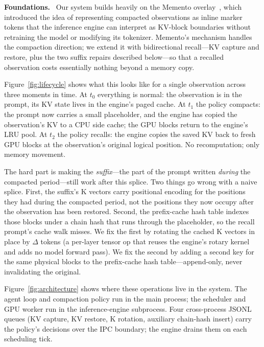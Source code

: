 \documentclass[letterpaper,twocolumn,10pt]{article}
\newcommand{\para}[1]{\smallskip\noindent\textbf{#1.}\ }
\begin{document}
\para{Foundations} Our system builds heavily on the Memento
overlay~\cite{kontonis2026memento}, which introduced the idea of
representing compacted observations as inline marker tokens that
the inference engine can interpret as KV-block boundaries
without retraining the model or modifying its tokenizer.
Memento's mechanism handles the compaction direction; we extend
it with bidirectional recall---KV capture and restore, plus the
two suffix repairs described below---so that a recalled
observation costs essentially nothing beyond a memory copy.

Figure~\ref{fig:lifecycle} shows what this looks like for a
single observation across three moments in time. At $t_0$
everything is normal: the observation is in the prompt, its KV
state lives in the engine's paged cache. At $t_1$ the policy
compacts: the prompt now carries a small placeholder, and the
engine has copied the observation's KV to a CPU side cache; the
GPU blocks return to the engine's LRU pool. At $t_2$ the policy
recalls: the engine copies the saved KV back to fresh GPU blocks
at the observation's original logical position. No
recomputation; only memory movement.

The hard part is making the \emph{suffix}---the part of the
prompt written \emph{during} the compacted period---still work
after this splice. Two things go wrong with a naive splice.
First, the suffix's K vectors carry positional encoding for the
positions they had during the compacted period, not the
positions they now occupy after the observation has been
restored. Second, the prefix-cache hash table indexes those
blocks under a chain hash that runs through the placeholder, so
the recall prompt's cache walk misses. We fix the first by
rotating the cached K vectors in place by $\Delta$ tokens (a
per-layer tensor op that reuses the engine's rotary kernel and
adds no model forward pass). We fix the second by adding a
second key for the same physical blocks to the prefix-cache hash
table---append-only, never invalidating the original.

Figure~\ref{fig:architecture} shows where these operations live
in the system. The agent loop and compaction policy run in the
main process; the scheduler and GPU worker run in the
inference-engine subprocess. Four cross-process JSONL queues
(KV capture, KV restore, K rotation, auxiliary chain-hash
insert) carry the policy's decisions over the IPC boundary; the
engine drains them on each scheduling tick.
\end{document}
